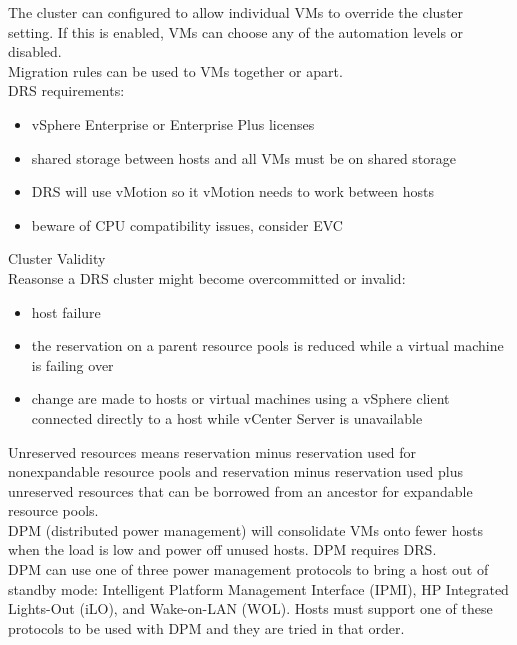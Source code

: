 The cluster can configured to allow individual VMs to override the cluster
setting. If this is enabled, VMs can choose any of the automation levels
or disabled.\\

Migration rules can be used to VMs together or apart.\\

DRS requirements:

\begin{itemize}
\item vSphere Enterprise or Enterprise Plus licenses
\item shared storage between hosts and all VMs must be on shared storage
\item DRS will use vMotion so it vMotion needs to work between hosts
\item beware of CPU compatibility issues, consider EVC
\end{itemize}

Cluster Validity\\

Reasonse a DRS cluster might become overcommitted or invalid:

\begin{itemize}

\item host failure

\item the reservation on a parent resource pools is reduced while a virtual
machine is failing over

\item change are made to hosts or virtual machines using a vSphere client
connected directly to a host while vCenter Server is unavailable

\end{itemize}

Unreserved resources means reservation minus reservation used for nonexpandable
resource pools and reservation minus reservation used plus unreserved
resources that can be borrowed from an ancestor for expandable resource
pools.\\

DPM (distributed power management) will consolidate VMs onto fewer hosts when
the load is low and power off unused hosts. DPM requires DRS.\\

DPM can use one of three power management protocols to bring a host out of
standby mode: Intelligent Platform Management Interface (IPMI), HP Integrated
Lights-Out (iLO), and Wake-on-LAN (WOL). Hosts must support one of these
protocols to be used with DPM and they are tried in that order.\\

